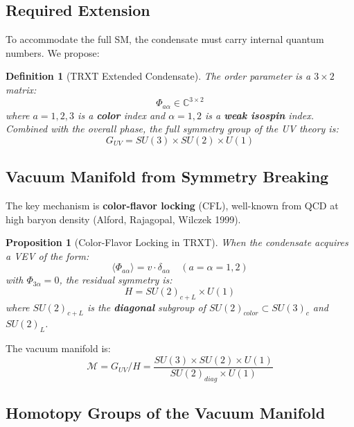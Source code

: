 \documentclass[12pt]{article}
\newtheorem{proposition}{Proposition}
\newtheorem{definition}{Definition}
\begin{document}
\subsection{Required Extension}
To accommodate the full SM, the condensate must carry internal quantum numbers. We propose:

\begin{definition}[TRXT Extended Condensate]
The order parameter is a $3 \times 2$ matrix:
\begin{equation}
    \Phi_{a\alpha} \in \mathbb{C}^{3 \times 2}
\end{equation}
where $a = 1,2,3$ is a \textbf{color} index and $\alpha = 1,2$ is a \textbf{weak isospin} index. Combined with the overall phase, the full symmetry group of the UV theory is:
\begin{equation}
    G_{UV} = SU(3) \times SU(2) \times U(1)
\end{equation}
\end{definition}

\subsection{Vacuum Manifold from Symmetry Breaking}

The key mechanism is \textbf{color-flavor locking} (CFL), well-known from QCD at high baryon density (Alford, Rajagopal, Wilczek 1999).

\begin{proposition}[Color-Flavor Locking in TRXT]
When the condensate acquires a VEV of the form:
\begin{equation}
    \langle \Phi_{a\alpha} \rangle = v \cdot \delta_{a\alpha} \quad (a = \alpha = 1,2)
\end{equation}
with $\Phi_{3\alpha} = 0$, the residual symmetry is:
\begin{equation}
    H = SU(2)_{c+L} \times U(1)
\end{equation}
where $SU(2)_{c+L}$ is the \textbf{diagonal} subgroup of $SU(2)_{color} \subset SU(3)_c$ and $SU(2)_L$.
\end{proposition}

The vacuum manifold is:
\begin{equation}
    \mathcal{M} = G_{UV} / H = \frac{SU(3) \times SU(2) \times U(1)}{SU(2)_{diag} \times U(1)}
\end{equation}

\subsection{Homotopy Groups of the Vacuum Manifold}
\end{document}
